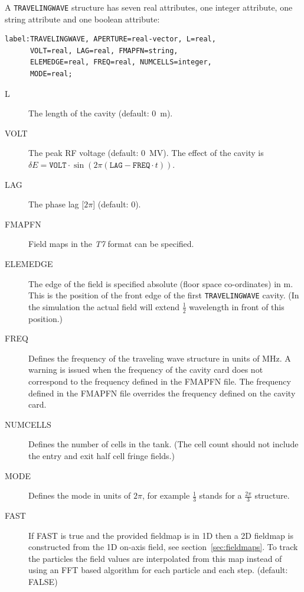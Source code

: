 A \texttt{TRAVELINGWAVE} structure has seven real attributes, one integer attribute, one string attribute and one boolean attribute:
\begin{verbatim}
label:TRAVELINGWAVE, APERTURE=real-vector, L=real,
      VOLT=real, LAG=real, FMAPFN=string,
      ELEMEDGE=real, FREQ=real, NUMCELLS=integer,
      MODE=real;
\end{verbatim}

\begin{description}
\item[L]
  The length of the cavity (default: 0~m).
\item[VOLT]
  The peak RF voltage (default: 0~MV).
  The effect of the cavity is
  $\delta E=\mathtt{VOLT}\cdot\sin(2\pi(\mathtt{LAG}- \mathtt{FREQ}\cdot t))$.
\item[LAG]
  The phase lag [$2\pi$] (default: 0).
\item[FMAPFN]
  Field maps in the {\em T7} format can be specified.
\item[ELEMEDGE]
  The edge of the field is specified absolute (floor space co-ordinates) in m. This is the position of the front edge
  of the first \texttt{TRAVELINGWAVE} cavity. (In the simulation the actual field will extend $\frac{1}{2}$ wavelength
  in front of this position.)
\item[FREQ]
  Defines the frequency of the traveling wave structure in units of MHz. A warning is issued when the frequency of
  the cavity card does not correspond to the frequency defined in the  FMAPFN file. The frequency defined in the FMAPFN
  file overrides the frequency defined on the cavity card. 
\item[NUMCELLS]
  Defines the number of cells in the tank. (The cell count should not include the entry and exit half cell fringe fields.)
\item[MODE]
Defines the mode in units of $2\pi$, for example $\frac{1}{3}$ stands for a $\frac{2 \pi}{3}$ structure.
\item[FAST]
If FAST is true and the provided fieldmap is in 1D then a 2D fieldmap is constructed from the 1D on-axis field, see section~\ref{sec:fieldmaps}. To track the particles the field values are interpolated from this map instead of using an FFT based algorithm for each particle and each step. (default: FALSE)
\end{description}


